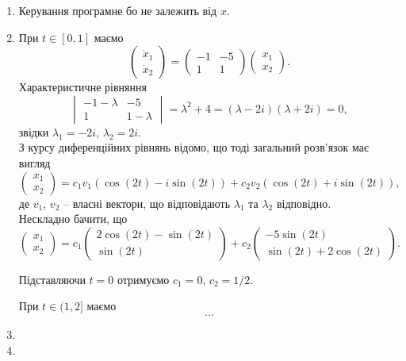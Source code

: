 \begin{solution}
	\begin{enumerate}
		\item Керування програмне бо не залежить від $x$.

		\item При $t \in [0, 1]$ маємо 
		\[
			\begin{pmatrix}
				\dot x_1 \\ 
				\dot x_2
			\end{pmatrix}
			=
			\begin{pmatrix}
				-1 & -5 \\
				1 & 1
			\end{pmatrix}
			\begin{pmatrix}
				x_1 \\
				x_2
			\end{pmatrix}.
		\]
		Характеристичне рівняння 
		\[
			\begin{vmatrix}
				-1 - \lambda & -5 \\
				1 & 1 - \lambda 
			\end{vmatrix}
			=
			\lambda^2 + 4 
			=
			(\lambda - 2 i) (\lambda + 2i)
			=
			0,
		\]
		звідки $\lambda_1 = - 2 i$, $\lambda_2 = 2 i$.\\
		
		З курсу диференційних рівнянь відомо, що тоді загальний розв'язок має вигляд
		\[
			\begin{pmatrix}
			x_1 \\
			x_2
			\end{pmatrix}
			=
			c_1 v_1 (\cos(2t) - i \sin(2t)) + c_2 v_2 (\cos(2t) + i \sin(2t)),
		\]
		де $v_1$, $v_2$ -- власні вектори, що відповідають $\lambda_1$ та $\lambda_2$ відповідно.\\
		
		Нескладно бачити, що 
		\[
			\begin{pmatrix}
				x_1 \\
				x_2
			\end{pmatrix}
			=
			c_1 
			\begin{pmatrix}
				2 \cos (2t) - \sin (2t) \\
				\sin (2t)
			\end{pmatrix} 
			+ 
			c_2 
			\begin{pmatrix}
				-5 \sin (2t) \\
				\sin(2t) + 2 \cos(2t)
			\end{pmatrix}.
		\]
		
		Підставляючи $t = 0$ отримуємо $c_1 = 0$, $c_2 = 1 / 2$.
		
		При $t \in (1, 2]$ маємо \[...\]

		\item

		\item
	\end{enumerate}
\end{solution}
